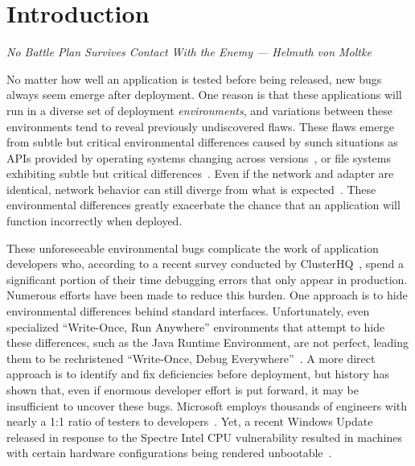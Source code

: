 \section{Introduction}
\label{SEC:introduction}
\textit{No Battle Plan Survives Contact With the Enemy --- Helmuth von Moltke}

No matter how well an application is tested before being released,
new bugs always seem emerge after deployment.
One reason is that these applications will run in a diverse set of
deployment \emph{environments},
and variations between these environments tend to
reveal previously undiscovered flaws.
These flaws emerge from subtle but critical environmental differences
caused by sunch situations as
APIs provided by operating systems changing across versions~\cite{LinuxGlibcChanges},
or file systems exhibiting subtle but critical
differences~\cite{EXT4Layout, AppleHFS}.
Even if the network and adapter are identical,
network behavior can still diverge from what is expected~\cite{vbox}.
These environmental differences greatly exacerbate
the chance that an application will function incorrectly when deployed.

These unforeseeable environmental bugs
complicate the work of application developers who, according to a
recent survey conducted by ClusterHQ~\cite{ClusterHQSurvey},
spend a significant portion of their time
debugging errors that only appear in production.
Numerous efforts have been made to reduce this burden.
One approach
is to hide environmental differences behind standard interfaces.
Unfortunately,
even specialized ``Write-Once, Run Anywhere'' environments
that attempt to hide these differences,
such as the Java Runtime Environment,
are not perfect,
leading them to be rechristened ``Write-Once, Debug Everywhere''~\cite{WODE}.
A more direct approach is
to identify and fix deficiencies before deployment,
but history has shown that,
even if enormous developer effort is put forward,
it may be insufficient to uncover these bugs.
Microsoft employs thousands of engineers with nearly a
1:1 ratio of testers to developers~\cite{Page2009}.
Yet, a recent Windows Update released
in response to the Spectre Intel CPU vulnerability
resulted in machines with certain hardware configurations
being rendered unbootable~\cite{kb4056892}.


